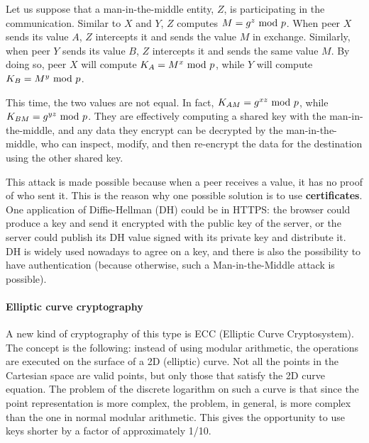 Let us suppose that a man-in-the-middle entity, $Z$, is participating in the communication. Similar to $X$ and $Y$, $Z$ computes $M = g^z \text{ mod } p$. When peer $X$ sends its value $A$, $Z$ intercepts it and sends the value $M$ in exchange. Similarly, when peer $Y$ sends its value $B$, $Z$ intercepts it and sends the same value $M$. By doing so, peer $X$ will compute $K_A = M^x \text{ mod } p$, while $Y$ will compute $K_B = M^y \text{ mod } p$.

This time, the two values are not equal. In fact, $K_{AM} = g^{xz} \text{ mod } p$, while $K_{BM} = g^{yz} \text{ mod } p$. They are effectively computing a shared key with the man-in-the-middle, and any data they encrypt can be decrypted by the man-in-the-middle, who can inspect, modify, and then re-encrypt the data for the destination using the other shared key.


This attack is made possible because when a peer receives a value, it has no proof of who sent it.
This is the reason why one possible solution is to use \textbf{certificates}. %
One application of Diffie-Hellman (DH) could be in HTTPS: the browser could produce a key and send it encrypted with the public key of the server, or the server could publish its DH value signed with its private key and distribute it.
DH is widely used nowadays to agree on a key, and there is also the possibility to have authentication (because otherwise, such a Man-in-the-Middle attack is possible).


\paragraph*{Elliptic curve cryptography}
A new kind of cryptography of this type is ECC (Elliptic Curve Cryptosystem). The concept is the following: instead of using modular arithmetic, the operations are executed on the surface of a 2D (elliptic) curve. Not all the points in the Cartesian space are valid points, but only those that satisfy the 2D curve equation. The problem of the discrete logarithm on such a curve is that since the point representation is more complex, the problem, in general, is more complex than the one in normal modular arithmetic. This gives the opportunity to use keys shorter by a factor of approximately 1/10.

